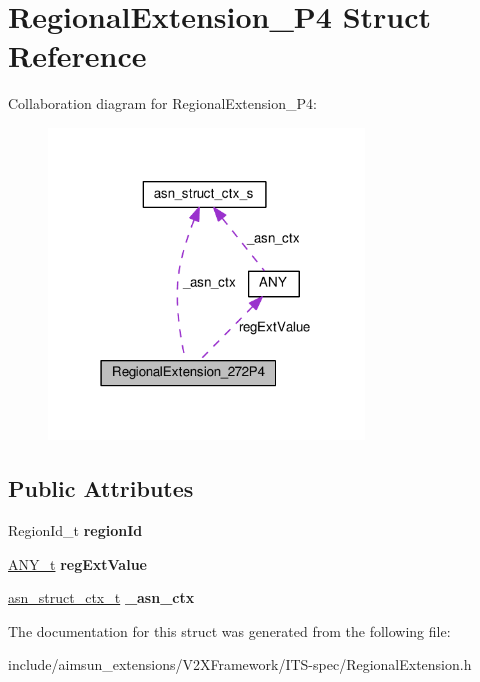 \hypertarget{structRegionalExtension__272P4}{}\section{Regional\+Extension\+\_\+P4 Struct Reference}
\label{structRegionalExtension__272P4}


Collaboration diagram for Regional\+Extension\+\_\+P4\+:\nopagebreak
\begin{figure}[H]
\begin{center}
\leavevmode
\includegraphics[width=238pt]{structRegionalExtension__272P4__coll__graph}
\end{center}
\end{figure}
\subsection*{Public Attributes}
\begin{DoxyCompactItemize}
\item 
Region\+Id\+\_\+t {\bfseries region\+Id}\hypertarget{structRegionalExtension__272P4_a980bab3a75f7e25a36efa113730d8453}{}\label{structRegionalExtension__272P4_a980bab3a75f7e25a36efa113730d8453}

\item 
\hyperlink{structANY}{A\+N\+Y\+\_\+t} {\bfseries reg\+Ext\+Value}\hypertarget{structRegionalExtension__272P4_a1ae3843431b6b7b18074162c9c92b8ba}{}\label{structRegionalExtension__272P4_a1ae3843431b6b7b18074162c9c92b8ba}

\item 
\hyperlink{structasn__struct__ctx__s}{asn\+\_\+struct\+\_\+ctx\+\_\+t} {\bfseries \+\_\+asn\+\_\+ctx}\hypertarget{structRegionalExtension__272P4_adf760896df1ce85925c75bff8dd5a4e7}{}\label{structRegionalExtension__272P4_adf760896df1ce85925c75bff8dd5a4e7}

\end{DoxyCompactItemize}


The documentation for this struct was generated from the following file\+:\begin{DoxyCompactItemize}
\item 
include/aimsun\+\_\+extensions/\+V2\+X\+Framework/\+I\+T\+S-\/spec/Regional\+Extension.\+h\end{DoxyCompactItemize}
